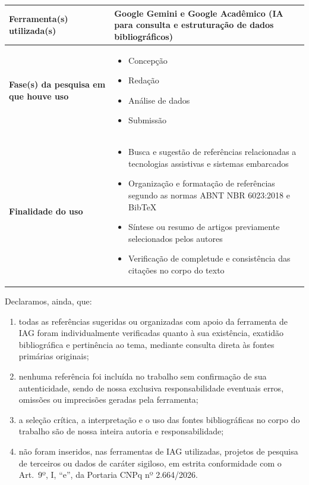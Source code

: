 \bigskip
\begin{center}
\begin{tabular}{|p{4.2cm}|p{9.8cm}|}
\hline
\textbf{Ferramenta(s) utilizada(s)} & Google Gemini e Google Acadêmico (IA para consulta e estruturação de dados bibliográficos) \\
\hline
\textbf{Fase(s) da pesquisa em que houve uso} &
\begin{itemize}[leftmargin=*, nosep]
  \item[$\square$] Concepção
  \item[$\blacksquare$] Redação
  \item[$\square$] Análise de dados
  \item[$\square$] Submissão
\end{itemize} \\
\hline
\textbf{Finalidade do uso} &
\begin{itemize}[leftmargin=*, nosep]
  \item[$\blacksquare$] Busca e sugestão de referências relacionadas a tecnologias assistivas e sistemas embarcados
  \item[$\blacksquare$] Organização e formatação de referências segundo as normas ABNT NBR 6023:2018 e BibTeX
  \item[$\square$] Síntese ou resumo de artigos previamente selecionados pelos autores
  \item[$\blacksquare$] Verificação de completude e consistência das citações no corpo do texto
\end{itemize} \\
\hline
\end{tabular}
\end{center}

\bigskip
\noindent
Declaramos, ainda, que:
\begin{enumerate}[label=\alph*)]
  \item todas as referências sugeridas ou organizadas com apoio da ferramenta de IAG foram individualmente verificadas quanto à sua existência, exatidão bibliográfica e pertinência ao tema, mediante consulta direta às fontes primárias originais;
  \item nenhuma referência foi incluída no trabalho sem confirmação de sua autenticidade, sendo de nossa exclusiva responsabilidade eventuais erros, omissões ou imprecisões geradas pela ferramenta;
  \item a seleção crítica, a interpretação e o uso das fontes bibliográficas no corpo do trabalho são de nossa inteira autoria e responsabilidade;
  \item não foram inseridos, nas ferramentas de IAG utilizadas, projetos de pesquisa de terceiros ou dados de caráter sigiloso, em estrita conformidade com o Art.~9º, I, ``e'', da Portaria CNPq nº 2.664/2026.
\end{enumerate}


